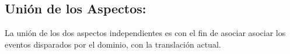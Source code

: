 	
\subsection{Unión de los Aspectos:}
\label{sec:Union}
La unión de los dos aspectos independientes es con el fin de asociar asociar los
eventos disparados por el dominio, con la translación actual.
 
